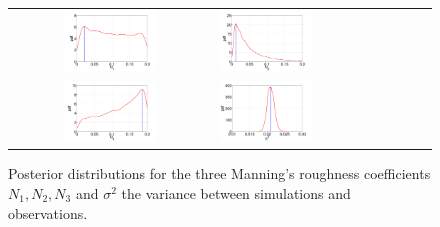  \begin{figure}[h]
        \begin{tabular}{clc}
\includegraphics[width=0.475\textwidth]{./figures/pdf_p1.pdf} &
\includegraphics[width=0.475\textwidth]{./figures/pdf_p2.pdf} \\
\includegraphics[width=0.475\textwidth]{./figures/pdf_p3.pdf} &
\includegraphics[width=0.475\textwidth]{./figures/pdf_s1.pdf}
        \end{tabular}
        \caption{Posterior distributions for the three Manning's roughness coefficients $N_1,N_2,N_3$ 
and $\sigma^2$ the variance between simulations and observations.}
\label{fig:pdfs} 
        \end{figure}
